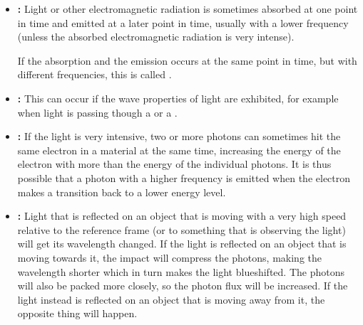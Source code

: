 \begin{itemize}
\item \textbf{:} Light or other electromagnetic radiation is sometimes absorbed at one point in time and emitted at a later point in time, usually with a lower frequency (unless the absorbed electromagnetic radiation is very intense).

If the absorption and the emission occurs at the same point in time, but with different frequencies, this is called .
    
\item \textbf{:} This can occur if the wave properties of light are exhibited, for example when light is passing though a  or a .
    
\item \textbf{:} If the light is very intensive, two or more photons can sometimes hit the same electron in a material at the same time, increasing the energy of the electron with more than the energy of the individual photons. It is thus possible that a photon with a higher frequency is emitted when the electron makes a transition back to a lower energy level.
    
\item \textbf{:} Light that is reflected on an object that is moving with a very high speed relative to the reference frame (or to something that is observing the light) will get its wavelength changed. If the light is reflected on an object that is moving towards it, the impact will compress the photons, making the wavelength shorter which in turn makes the light blueshifted. The photons will also be packed more closely, so the photon flux will be increased. If the light instead is reflected on an object that is moving away from it, the opposite thing will happen.
\end{itemize}

